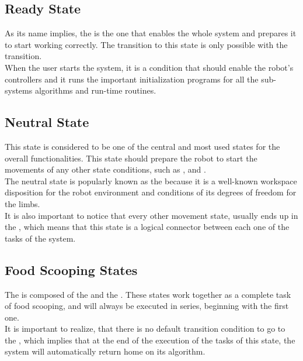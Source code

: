 \documentclass[11pt]{report} %
\begin{document}
\subsection{Ready State}

As its name implies, the  is the one that enables the whole system and prepares it to start working correctly. The transition to this state is only possible with the  transition.\\

When the user starts the system, it is a condition that should enable the robot's controllers and it runs the important initialization programs for all the sub-systems algorithms and run-time routines.\\

\subsection{Neutral State}

This state is considered to be one of the central and most used states for the overall functionalities. This state should prepare the robot to start the movements of any other state conditions, such as ,  and .\\

The neutral state is popularly known as the  because it is a well-known workspace disposition for the robot environment and conditions of its degrees of freedom for the limbs.\\

It is also important to notice that every other movement state, usually ends up in the , which means that this state is a logical connector between each one of the tasks of the system.\\

\subsection{Food Scooping States}

The  is composed of the  and the . These states work together as a complete task of food scooping, and will always be executed in series, beginning with the first one.\\

It is important to realize, that there is no default transition condition to go to the , which implies that at the end of the execution of the tasks of this state, the system will automatically return home on its algorithm.\\
\end{document}
